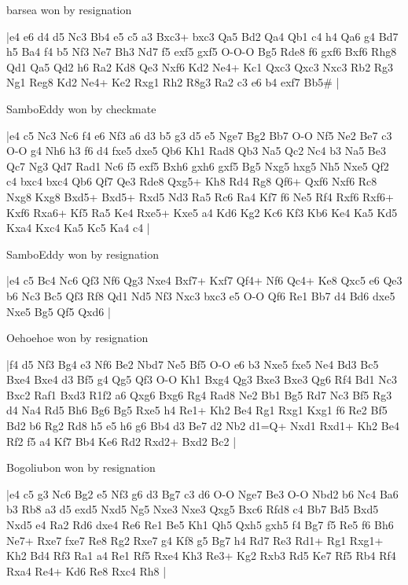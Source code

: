 \showboard

barsea won by resignation

\makegametitle
|e4 e6 d4 d5 Nc3 Bb4 e5 c5 a3 Bxc3+ bxc3 Qa5 Bd2 Qa4 Qb1 c4 h4 Qa6 g4 Bd7 h5 Ba4 f4 b5 Nf3 Ne7 Bh3 Nd7 f5 exf5 gxf5 O-O-O Bg5 Rde8 f6 gxf6 Bxf6 Rhg8 Qd1 Qa5 Qd2 h6 Ra2 Kd8 Qe3 Nxf6 Kd2 Ne4+ Kc1 Qxc3 Qxc3 Nxc3 Rb2 Rg3 Ng1 Reg8 Kd2 Ne4+ Ke2 Rxg1 Rh2 R8g3 Ra2 c3 e6 b4 exf7 Bb5\#  |

\showboard

SamboEddy won by checkmate

\makegametitle
|e4 c5 Nc3 Nc6 f4 e6 Nf3 a6 d3 b5 g3 d5 e5 Nge7 Bg2 Bb7 O-O Nf5 Ne2 Be7 c3 O-O g4 Nh6 h3 f6 d4 fxe5 dxe5 Qb6 Kh1 Rad8 Qb3 Na5 Qc2 Nc4 b3 Na5 Be3 Qc7 Ng3 Qd7 Rad1 Nc6 f5 exf5 Bxh6 gxh6 gxf5 Bg5 Nxg5 hxg5 Nh5 Nxe5 Qf2 c4 bxc4 bxc4 Qb6 Qf7 Qe3 Rde8 Qxg5+ Kh8 Rd4 Rg8 Qf6+ Qxf6 Nxf6 Rc8 Nxg8 Kxg8 Bxd5+ Bxd5+ Rxd5 Nd3 Ra5 Rc6 Ra4 Kf7 f6 Ne5 Rf4 Rxf6 Rxf6+ Kxf6 Rxa6+ Kf5 Ra5 Ke4 Rxe5+ Kxe5 a4 Kd6 Kg2 Kc6 Kf3 Kb6 Ke4 Ka5 Kd5 Kxa4 Kxc4 Ka5 Kc5 Ka4 c4  |

\showboard

SamboEddy won by resignation

\makegametitle
|e4 c5 Bc4 Nc6 Qf3 Nf6 Qg3 Nxe4 Bxf7+ Kxf7 Qf4+ Nf6 Qc4+ Ke8 Qxc5 e6 Qe3 b6 Nc3 Bc5 Qf3 Rf8 Qd1 Nd5 Nf3 Nxc3 bxc3 e5 O-O Qf6 Re1 Bb7 d4 Bd6 dxe5 Nxe5 Bg5 Qf5 Qxd6  |

\showboard

Oehoehoe won by resignation

\makegametitle
|f4 d5 Nf3 Bg4 e3 Nf6 Be2 Nbd7 Ne5 Bf5 O-O e6 b3 Nxe5 fxe5 Ne4 Bd3 Bc5 Bxe4 Bxe4 d3 Bf5 g4 Qg5 Qf3 O-O Kh1 Bxg4 Qg3 Bxe3 Bxe3 Qg6 Rf4 Bd1 Nc3 Bxc2 Raf1 Bxd3 R1f2 a6 Qxg6 Bxg6 Rg4 Rad8 Ne2 Bb1 Bg5 Rd7 Nc3 Bf5 Rg3 d4 Na4 Rd5 Bh6 Bg6 Bg5 Rxe5 h4 Re1+ Kh2 Be4 Rg1 Rxg1 Kxg1 f6 Re2 Bf5 Bd2 b6 Rg2 Rd8 h5 e5 h6 g6 Bb4 d3 Be7 d2 Nb2 d1=Q+ Nxd1 Rxd1+ Kh2 Be4 Rf2 f5 a4 Kf7 Bb4 Ke6 Rd2 Rxd2+ Bxd2 Bc2  |

\showboard

Bogoliubon won by resignation

\makegametitle
|e4 c5 g3 Nc6 Bg2 e5 Nf3 g6 d3 Bg7 c3 d6 O-O Nge7 Be3 O-O Nbd2 b6 Nc4 Ba6 b3 Rb8 a3 d5 exd5 Nxd5 Ng5 Nxe3 Nxe3 Qxg5 Bxc6 Rfd8 c4 Bb7 Bd5 Bxd5 Nxd5 e4 Ra2 Rd6 dxe4 Re6 Re1 Be5 Kh1 Qh5 Qxh5 gxh5 f4 Bg7 f5 Re5 f6 Bh6 Ne7+ Rxe7 fxe7 Re8 Rg2 Rxe7 g4 Kf8 g5 Bg7 h4 Rd7 Re3 Rd1+ Rg1 Rxg1+ Kh2 Bd4 Rf3 Ra1 a4 Re1 Rf5 Rxe4 Kh3 Re3+ Kg2 Rxb3 Rd5 Ke7 Rf5 Rb4 Rf4 Rxa4 Re4+ Kd6 Re8 Rxc4 Rh8  |

